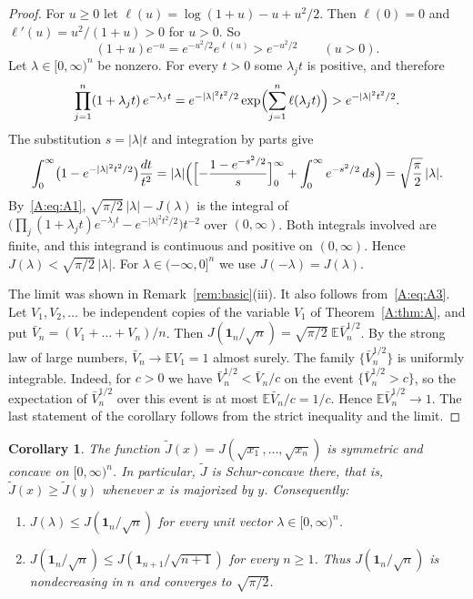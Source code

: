 \documentclass[11pt]{amsart}
\newtheorem{corollary}[theorem]{Corollary}
\theoremstyle{remark}
\numberwithin{equation}{section}
\newcommand{\E}{\mathbb{E}}
\begin{document}
\begin{proof}
For $u\ge0$ let $\ell(u)=\log(1+u)-u+u^2/2$. Then $\ell(0)=0$ and $\ell'(u)=u^2/(1+u)>0$ for $u>0$. So
\[
(1+u)e^{-u}=e^{-u^2/2}e^{\ell(u)}>e^{-u^2/2}\qquad(u>0).
\]
Let $\lambda\in[0,\infty)^n$ be nonzero. For every $t>0$ some $\lambda_jt$ is positive, and therefore
\[
\prod_{j=1}^n(1+\lambda_jt)\,e^{-\lambda_jt}=e^{-|\lambda|^2t^2/2}\exp\Bigl(\sum_{j=1}^n\ell(\lambda_jt)\Bigr)>e^{-|\lambda|^2t^2/2}.
\]
The substitution $s=|\lambda|t$ and integration by parts give
\[
\int_0^\infty\bigl(1-e^{-|\lambda|^2t^2/2}\bigr)\frac{dt}{t^2}=|\lambda|\Bigl(\Bigl[-\frac{1-e^{-s^2/2}}{s}\Bigr]_0^\infty+\int_0^\infty e^{-s^2/2}\,ds\Bigr)=\sqrt{\frac\pi2}\,|\lambda|.
\]
By~\eqref{A:eq:A1}, $\sqrt{\pi/2}\,|\lambda|-J(\lambda)$ is the integral of $\bigl(\prod_j(1+\lambda_jt)e^{-\lambda_jt}-e^{-|\lambda|^2t^2/2}\bigr)t^{-2}$ over $(0,\infty)$. Both integrals involved are finite, and this integrand is continuous and positive on $(0,\infty)$. Hence $J(\lambda)<\sqrt{\pi/2}\,|\lambda|$. For $\lambda\in(-\infty,0]^n$ we use $J(-\lambda)=J(\lambda)$.

The limit was shown in Remark~\ref{rem:basic}(iii). It also follows from~\eqref{A:eq:A3}. Let $V_1,V_2,\dots$ be independent copies of the variable $V_1$ of Theorem~\ref{A:thm:A}, and put $\bar V_n=(V_1+\dots+V_n)/n$. Then $J(\mathbf 1_n/\sqrt n)=\sqrt{\pi/2}\;\E\bar V_n^{1/2}$. By the strong law of large numbers, $\bar V_n\to\E V_1=1$ almost surely. The family $\{\bar V_n^{1/2}\}$ is uniformly integrable. Indeed, for $c>0$ we have $\bar V_n^{1/2}<\bar V_n/c$ on the event $\{\bar V_n^{1/2}>c\}$, so the expectation of $\bar V_n^{1/2}$ over this event is at most $\E\bar V_n/c=1/c$. Hence $\E\bar V_n^{1/2}\to1$. The last statement of the corollary follows from the strict inequality and the limit.
\end{proof}

\begin{corollary}\label{A:cor:schur}
The function $\tilde J(x)=J(\sqrt{x_1},\dots,\sqrt{x_n})$ is symmetric and concave on $[0,\infty)^n$. In particular, $\tilde J$ is Schur-concave there, that is, $\tilde J(x)\ge \tilde J(y)$ whenever $x$ is majorized by $y$. Consequently:
\begin{enumerate}[label=(\roman*)]
\item $J(\lambda)\le J(\mathbf 1_n/\sqrt n)$ for every unit vector $\lambda\in[0,\infty)^n$.
\item $J(\mathbf 1_n/\sqrt n)\le J(\mathbf 1_{n+1}/\sqrt{n+1})$ for every $n\ge1$. Thus $J(\mathbf 1_n/\sqrt n)$ is nondecreasing in $n$ and converges to $\sqrt{\pi/2}$.
\end{enumerate}
\end{corollary}
\end{document}
